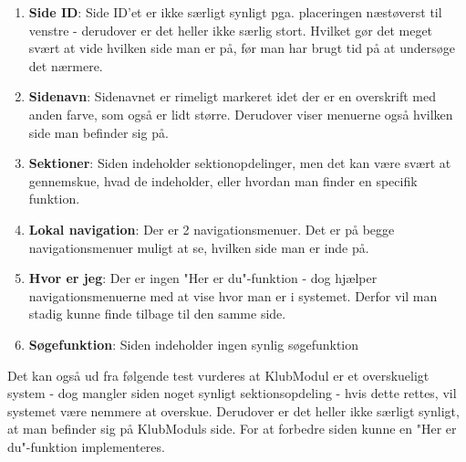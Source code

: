 \begin{enumerate}
	\item \textbf{Side ID}: Side ID'et er ikke særligt synligt pga. placeringen næstøverst til venstre - derudover er det heller ikke særlig stort. Hvilket gør det meget svært at vide hvilken side man er på, før man har brugt tid på at undersøge det nærmere.
	\item \textbf{Sidenavn}: Sidenavnet er rimeligt markeret idet der er en overskrift med anden farve, som også er lidt større. Derudover viser menuerne også hvilken side man befinder sig på. %
	\item \textbf{Sektioner}: Siden indeholder sektionopdelinger, men det kan være svært at gennemskue, hvad de indeholder, eller hvordan man finder en specifik funktion.
	\item \textbf{Lokal navigation}: Der er 2 navigationsmenuer. Det er på begge navigationsmenuer muligt at se, hvilken side man er inde på.
	\item \textbf{Hvor er jeg}: Der er ingen "Her er du"\mbox{}-funktion - dog hjælper navigationsmenuerne med at vise hvor man er i systemet. Derfor vil man stadig kunne finde tilbage til den samme side.
	\item \textbf{Søgefunktion}: Siden indeholder ingen synlig søgefunktion
\end{enumerate}

Det kan også ud fra følgende test vurderes at KlubModul er et overskueligt system - dog mangler siden noget synligt sektionsopdeling - hvis dette rettes, vil systemet være nemmere at overskue. Derudover er det heller ikke særligt synligt, at man befinder sig på KlubModuls side. For at forbedre siden kunne en "Her er du"\mbox{}-funktion implementeres.

